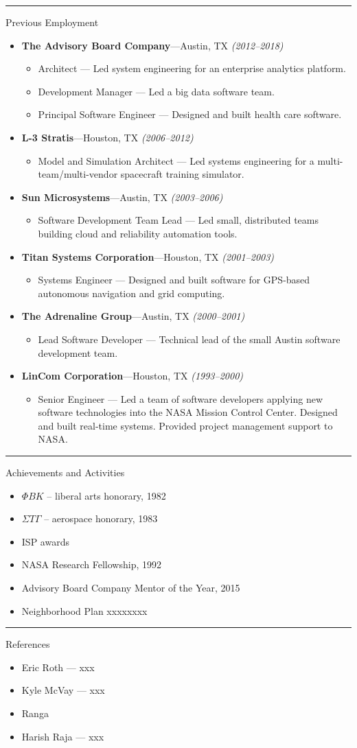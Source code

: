 \documentclass[11pt,oneside]{article}
\newenvironment{ressection}[1]{
	\rule{\textwidth}{0.25pt}	\vspace{4pt}
	{\fontfamily{phv}\selectfont\Large#1}
	\begin{itemize}
	\vspace{3pt}
}{
	\end{itemize}
}
\newcommand{\resitem}[1]{
	\vspace{-4pt}
	\item \begin{flushleft} #1 \end{flushleft}
}
\newcommand{\ressubitem}[1]{
	\vspace{-1pt}
	\item \begin{flushleft} #1 \end{flushleft}
}
\newcommand{\resbigitem}[3]{
	\vspace{-5pt}
	\item
	\textbf{#1}---#2 
	\textit{(#3)}
}
\newenvironment{ressubsec}[3]{
	\resbigitem{#1}{#2}{#3}
	\vspace{-2pt}
	\begin{itemize}
}{
	\end{itemize}
}
\begin{document}
\begin{ressection}{Previous Employment}

	\begin{ressubsec}{The Advisory Board Company}{Austin, TX}{2012--2018}
		\ressubitem{Architect --- Led system engineering for an enterprise analytics platform.}
		\ressubitem{Development Manager --- Led a big data software team. }
		\ressubitem{Principal Software Engineer --- Designed and built health care software.}
	\end{ressubsec}

	\begin{ressubsec}{L-3 Stratis}{Houston, TX}{2006--2012}
		\ressubitem{Model and Simulation Architect --- Led systems engineering for a multi-team/multi-vendor spacecraft training simulator.}
	\end{ressubsec}

	\begin{ressubsec}{Sun Microsystems}{Austin, TX}{2003--2006}
		\ressubitem{Software Development Team Lead --- Led small, distributed teams building cloud and reliability automation tools.}
	\end{ressubsec}

	\begin{ressubsec}{Titan Systems Corporation}{Houston, TX}{2001--2003}
		\ressubitem{Systems Engineer --- Designed and built software for GPS-based autonomous navigation and grid computing.}
	\end{ressubsec}

	\begin{ressubsec}{The Adrenaline Group}{Austin, TX}{2000--2001}
		\ressubitem{Lead Software Developer --- Technical lead of the small Austin software development team.}
	\end{ressubsec}

	\begin{ressubsec}{LinCom Corporation}{Houston, TX}{1993--2000}
		\ressubitem{Senior Engineer --- Led a team of software developers 
		applying new software technologies into the NASA Mission Control Center. 
		Designed and built real-time systems. Provided project management support to NASA. }
	\end{ressubsec}

\end{ressection}



\begin{ressection}{Achievements and Activities}

	\resitem{$\Phi B K$ -- liberal arts honorary, 1982}
	\resitem{$\Sigma T \Gamma$ -- aerospace honorary, 1983}
	\resitem{ISP awards}
	\resitem{NASA Research Fellowship, 1992}
	\resitem{Advisory Board Company Mentor of the Year, 2015}
	\resitem{Neighborhood Plan xxxxxxxx}

\end{ressection}




\begin{ressection}{References}
	\resitem{Eric Roth --- xxx}
	\resitem{Kyle McVay --- xxx}
	\resitem{Ranga}
	\resitem{Harish Raja --- xxx}
\end{ressection}
\end{document}
